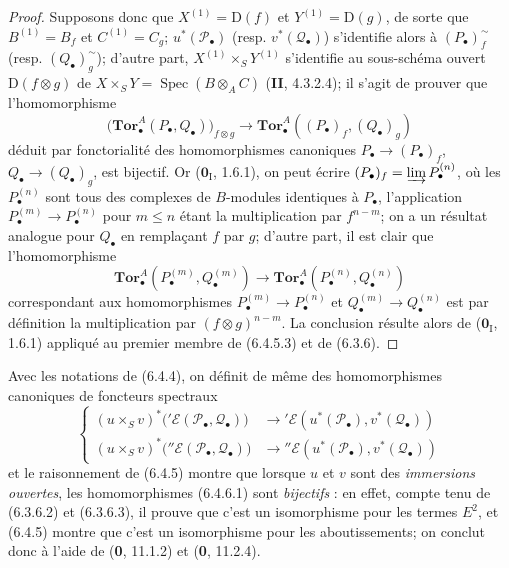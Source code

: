\begin{proof}
Supposons donc que $X^{(1)}=\mathrm D(f)$ et $Y^{(1)}=\mathrm D(g)$, de sorte
que $B^{(1)}=B_f$ et $C^{(1)}=C_g$; $u^*(\mathscr P_\bullet)$ (resp.
$v^*(\mathscr Q_\bullet)$) s'identifie alors à
$(P_\bullet)_f^{\sim}$ (resp. $(Q_\bullet)_g^{\sim}$); d'autre part,
$X^{(1)}\times_S Y^{(1)}$ s'identifie au sous-schéma ouvert
$\mathrm D(f\otimes g)$ de
$X\times_S Y=\operatorname{Spec}(B\otimes_A C)$ (\textbf{II}, 4.3.2.4); il s'agit de
prouver que l'homomorphisme
\[
  \bigl(\mathbf{Tor}_\bullet^A(P_\bullet,Q_\bullet)\bigr)_{f\otimes g}
  \longrightarrow
  \mathbf{Tor}_\bullet^A((P_\bullet)_f,(Q_\bullet)_g)
  \tag{6.4.5.3}\label{III.6.4.5.3.fr}
\]
déduit par fonctorialité des homomorphismes canoniques
$P_\bullet\to(P_\bullet)_f$, $Q_\bullet\to(Q_\bullet)_g$, est bijectif. Or
($\mathbf{0}_{\mathrm I}$, 1.6.1), on peut écrire
$(P_\bullet)_f=\varinjlim P_\bullet^{(n)}$, où les $P_\bullet^{(n)}$ sont tous
des complexes de $B$-modules identiques à $P_\bullet$, l'application
$P_\bullet^{(m)}\to P_\bullet^{(n)}$ pour $m\leqslant n$ étant la
multiplication par $f^{n-m}$; on a un résultat analogue pour $Q_\bullet$ en
remplaçant $f$ par $g$; d'autre part, il est clair que l'homomorphisme
\[
  \mathbf{Tor}_\bullet^A(P_\bullet^{(m)},Q_\bullet^{(m)})
  \longrightarrow
  \mathbf{Tor}_\bullet^A(P_\bullet^{(n)},Q_\bullet^{(n)})
\]
correspondant aux homomorphismes
$P_\bullet^{(m)}\to P_\bullet^{(n)}$ et
$Q_\bullet^{(m)}\to Q_\bullet^{(n)}$ est par définition la multiplication
par $(f\otimes g)^{n-m}$. La conclusion résulte alors de ($\mathbf{0}_{\mathrm I}$,
1.6.1) appliqué au premier membre de (6.4.5.3) et de (6.3.6).
\end{proof}

\begin{env}[6.4.6]
Avec les notations de (6.4.4), on définit de même des homomorphismes canoniques
de foncteurs spectraux
\[
  \left\{
  \begin{aligned}
  (u\times_S v)^*\bigl('\mathscr E(\mathscr P_\bullet,\mathscr Q_\bullet)\bigr)
    &\longrightarrow
      '\mathscr E(u^*(\mathscr P_\bullet),v^*(\mathscr Q_\bullet))\\
  (u\times_S v)^*\bigl(''\mathscr E(\mathscr P_\bullet,\mathscr Q_\bullet)\bigr)
    &\longrightarrow
      ''\mathscr E(u^*(\mathscr P_\bullet),v^*(\mathscr Q_\bullet))
  \end{aligned}
  \right.
  \tag{6.4.6.1}\label{III.6.4.6.1.fr}
\]
et le raisonnement de (6.4.5) montre que lorsque $u$ et $v$ sont des
\emph{immersions ouvertes}, les homomorphismes (6.4.6.1) sont \emph{bijectifs} : en effet,
compte tenu de (6.3.6.2) et (6.3.6.3), il prouve que c'est un isomorphisme pour
les termes $E^2$, et (6.4.5) montre que c'est un isomorphisme pour les
aboutissements; on conclut donc à l'aide de (\textbf{0}, 11.1.2) et (\textbf{0}, 11.2.4).
\end{env}

